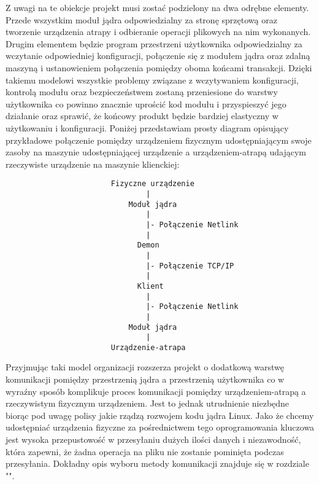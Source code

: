 \documentclass[10pt]{scrartcl}
\begin{document}
Z uwagi na te obiekcje projekt musi zostać podzielony na dwa odrębne elementy. Przede wszystkim moduł jądra odpowiedzialny za stronę sprzętową oraz tworzenie urządzenia atrapy i odbieranie operacji plikowych na nim wykonanych. Drugim elementem będzie program przestrzeni użytkownika odpowiedzialny za wczytanie odpowiedniej konfiguracji, połączenie się z modułem jądra oraz zdalną maszyną i ustanowieniem połączenia pomiędzy oboma końcami transakcji. Dzięki takiemu modelowi wszystkie problemy związane z wczytywaniem konfiguracji, kontrolą modułu oraz bezpieczeństwem zostaną przeniesione do warstwy użytkownika co powinno znacznie uprościć kod modułu i przyspieszyć jego działanie oraz sprawić, że końcowy produkt będzie bardziej elastyczny w użytkowaniu i konfiguracji. Poniżej przedstawiam prosty diagram opisujący przykładowe połączenie pomiędzy urządzeniem fizycznym udostępniającym swoje zasoby na maszynie udostępniającej urządzenie a urządzeniem-atrapą udającym rzeczywiste urządzenie na maszynie klienckiej:

\begin{verbatim}
                        Fizyczne urządzenie
                                |
                            Moduł jądra
                                |
                                |- Połączenie Netlink
                                |
                              Demon
                                |
                                |- Połączenie TCP/IP
                                |
                              Klient
                                |
                                |- Połączenie Netlink
                                |
                            Moduł jądra
                                |
                        Urządzenie-atrapa
\end{verbatim}

Przyjmując taki model organizacji rozszerza projekt o dodatkową warstwę komunikacji pomiędzy przestrzenią jądra a przestrzenią użytkownika co w wyraźny sposób komplikuje proces komunikacji pomiędzy urządzeniem-atrapą a rzeczywistym fizycznym urządzeniem. Jest to jednak utrudnienie niezbędne biorąc pod uwagę polisy jakie rządzą rozwojem kodu jądra Linux. Jako że chcemy udostępniać urządzenia fizyczne za pośrednictwem tego oprogramowania kluczowa jest wysoka przepustowość w przesyłaniu dużych ilości danych i niezawodność, która zapewni, że żadna operacja na pliku nie zostanie pominięta podczas przesyłania. Dokładny opis wyboru metody komunikacji znajduje się w rozdziale "".
\end{document}
